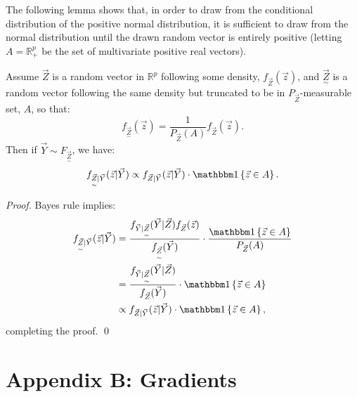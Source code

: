 {The following lemma shows that, in order to draw from the conditional distribution of the positive normal distribution, it is sufficient to draw from the normal distribution until the drawn random vector is entirely positive (letting $A = \mathbb{R}_+^p$ be the set of multivariate positive real vectors).
\begin{lemma}
Assume $\vec{Z}$ is a random vector in $\mathbb{R}^p$ following some density, $f_{\vec{Z}}(\vec{z})$, and $\underset{\sim}{\vec{Z}}$ is a random vector following the same density but truncated to be in $P_{\vec{Z}}$-measurable set, $A$, so that:
$$ f_{\underset{\sim}{\vec{Z}}}(\vec{z}) = \frac{1}{P_{\vec{Z}}(A)} f_{\vec{Z}}(\vec{z}). $$
Then if $\vec{Y} \sim F_{\underset{\sim}{\vec{Z}}}$, we have:
$$ f_{\underset{\sim}{\vec{Z}} \vert \vec{Y}}(\vec{z} \vert \vec{Y}) \propto f_{\vec{Z} \vert \vec{Y}}(\vec{z} \vert \vec{Y}) \cdot \ind\set{\vec{z} \in A}. $$
\end{lemma}

\begin{proof}
Bayes rule implies:
\begin{align*}
f_{\underset{\sim}{\vec{Z}} \vert \vec{Y}}(\vec{z} \vert \vec{Y}) &= \frac{f_{\vec{Y} \vert \underset{\sim}{\vec{Z}}}(\vec{Y} \vert \vec{Z}) f_{\vec{Z}}(\vec{z})}{f_{\underset{\sim}{\vec{Z}}}(\vec{Y})} \cdot \frac{\ind \set{\vec{z} \in A}}{P_{\vec{Z}}(A)} \\
&= \frac{f_{\vec{Y} \vert \underset{\sim}{\vec{Z}}}(\vec{Y} \vert \vec{Z})}{f_{\vec{Z}}(\vec{Y})} \cdot \ind \set{\vec{z} \in A} \\
&\propto f_{\vec{Z} \vert \vec{Y}}(\vec{z} \vert \vec{Y}) \cdot \ind\set{\vec{z} \in A},
\end{align*}
completing the proof. \qed
\end{proof}

\section*{Appendix B: Gradients}

}
